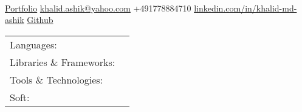 \documentclass[]{awesome-cv}
\begin{document}
    
\begin{center}
	  \\
	\vspace{2mm}
	\href{k-ashik.github.io/Khalid-The-Data- Analyst.github.io/}{{\textcolor{darkblue}{\faGlobe} Portfolio}}
	\hspace{2mm}
	\href{mailto:khalid.ashik@yahoo.com}{{\textcolor{darkblue}{\faEnvelope} khalid.ashik@yahoo.com}}
	\hspace{2mm} 
 	{\textcolor{darkblue}{\faPhone} +491778884710}
	\hspace{2mm}
	\href{linkedin.com/in/khalid-md-ashik}{{\textcolor{darkblue}{\faLinkedin} linkedin.com/in/khalid-md-ashik}}
	\hspace{2mm} 
	\href{github.com/K-Ashik}{{\textcolor{darkblue}{\faGithub} Github}}
\end{center}
\vspace{-4mm}
\begin{cventries}
	\cventry
	{}
	{\def\arraystretch{1.15}{\begin{tabular}{ l l }
		Languages:  & \hspace{1mm} {\skill{ Python, R Programming, SQL }} \\
		Libraries \& Frameworks:  & \hspace{1mm} {\skill{ Pandas, Numpy, Machine Learning }} \\
		Tools \& Technologies:  & \hspace{1mm} {\skill{ Tableau, PowerBI, Excel, MS Office, Git, Jupyter Notebook, A/B testing}} \\
		Soft:  & \hspace{1mm} {\skill{ Research, Presentation, Collaborative, Data Analysis}} \\
		\end{tabular}}}
	{}
	{}
	{}
\end{cventries}
\end{document}
